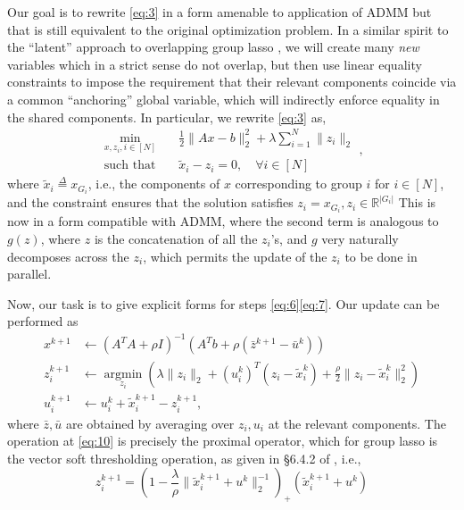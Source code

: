 \documentclass{article}
\begin{document}
Our goal is to rewrite \eqref{eq:3} in a form amenable to application of ADMM but that is still equivalent to the original optimization problem.
In a similar spirit to the ``latent'' approach to overlapping group lasso \cite{jacob_group_2009,obozinski_group_2011}, we will create many \emph{new} variables which in a strict sense do not overlap, but then use linear equality constraints to impose the requirement that their relevant components coincide via a common ``anchoring'' global variable, which will indirectly enforce equality in the shared components.
In particular, we rewrite \eqref{eq:3} as,
\begin{equation}
  \begin{aligned}
  \label{eq:9}
  \operatorname*{min}_{x,z_i, i \in [N]} \quad &\frac{1}{2} \lVert A x - b \rVert_2^2 + \lambda \sum_{i=1}^N \lVert z_i \rVert_2 \\
  \text{such that} \quad & \tilde{x}_i - z_i = 0, \quad \forall i \in [N]
  \end{aligned},
\end{equation}
where $\tilde{x}_i \overset{\Delta}{=} x_{G_i}$, i.e., the components of $x$ corresponding to group $i$ for $i \in [N]$, and the constraint ensures that the solution satisfies $z_i = x_{G_i}, z_i \in \mathbb{R}^{\left| G_i \right|}$
This is now in a form compatible with ADMM, where the second term is analogous to $g(z)$, where $z$ is the concatenation of all the $z_i$'s, and $g$ very naturally decomposes across the $z_i$, which permits the update of the $z_i$ to be done in parallel.

Now, our task is to give explicit forms for steps \eqref{eq:6}\eqref{eq:7}.
Our update can be performed as
\begin{align}
  \label{eq:11}
  x^{k+1} &\leftarrow (A^TA + \rho I)^{-1}(A^T b + \rho(\bar{z}^{k+1} - \bar{u}^k)) \\
  \label{eq:10}
  z_i^{k+1} &\leftarrow \operatorname*{argmin}_{z_i} (\lambda \lVert z_i \rVert_2 + \left( u_i^k \right)^T(z_i - \tilde{x}_i^k) + \frac{\rho}{2} \lVert z_i - \tilde{x}_i^k \rVert_2^2) \\
  \label{eq:12}
  u_i^{k+1} &\leftarrow u_i^k +  \tilde{x}_i^{k+1} - z_i^{k+1},
\end{align}
where $\bar{z}, \bar{u}$ are obtained by averaging over $z_i, u_i$ at the relevant components.
The operation at \eqref{eq:10} is precisely the proximal operator, which for group lasso is the vector soft thresholding operation, as given in \S 6.4.2 of \cite{boyd_distributed_2011}, i.e.,
\begin{equation}
  \label{eq:13}
  z_i^{k+1} = (1 - \frac{\lambda}{\rho} \lVert \tilde{x}_i^{k+1} + u^k \rVert_2^{-1})_+ (\tilde{x}_i^{k+1} + u^k)
\end{equation}
\end{document}
